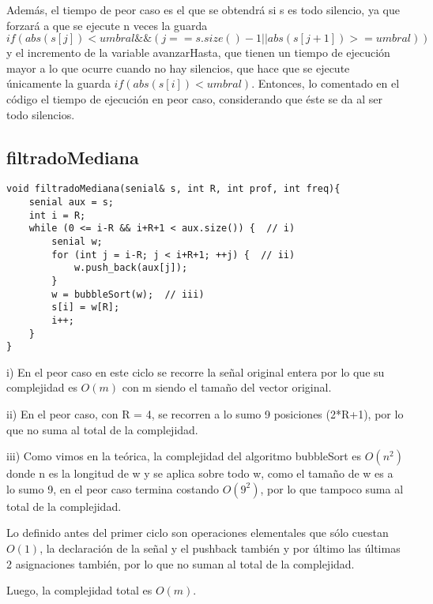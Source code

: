 \documentclass{article}
\begin{document}
Además, el tiempo de peor caso es el que se obtendrá si s es todo silencio, ya que forzará a que se ejecute n
veces la guarda $if(abs(s[j]) < umbral \&\& (j == s.size()-1 || abs(s[j+1]) >= umbral))$ y el incremento de
la variable avanzarHasta, que tienen un tiempo de ejecución mayor a lo que ocurre cuando no hay silencios,
que hace que se ejecute únicamente la guarda $if(abs(s[i]) < umbral)$. Entonces, lo comentado en el código el tiempo de
ejecución en peor caso, considerando que éste se da al ser todo silencios.


\newpage
\subsection{filtradoMediana}
\begin{lstlisting}
void filtradoMediana(senial& s, int R, int prof, int freq){
    senial aux = s;
    int i = R;
    while (0 <= i-R && i+R+1 < aux.size()) {  // i)
        senial w;
        for (int j = i-R; j < i+R+1; ++j) {  // ii)
            w.push_back(aux[j]);
        }
        w = bubbleSort(w);  // iii)
        s[i] = w[R];
        i++;
    }
}
\end{lstlisting}

i) En el peor caso en este ciclo se recorre la señal original entera por lo que su complejidad es $O(m)$ con m siendo el tamaño del vector original.

ii) En el peor caso, con R = 4, se recorren a lo sumo 9 posiciones (2*R+1), por lo que no suma al total de la complejidad.

iii) Como vimos en la teórica, la complejidad del algoritmo bubbleSort es $O(n^2)$ donde n es la longitud de w y se aplica sobre todo w, como el tamaño de w es a lo sumo 9, en el peor caso termina costando $O(9^2)$, por lo que tampoco suma al total de la complejidad.

Lo definido antes del primer ciclo son operaciones elementales que sólo cuestan $O(1)$, la declaración de la señal y el pushback también y por último las últimas 2 asignaciones también, por lo que no suman al total de la complejidad.

Luego, la complejidad total es $O(m)$.
\end{document}
